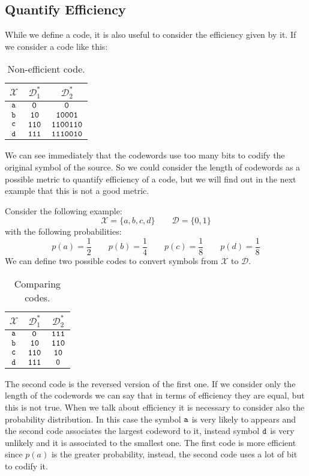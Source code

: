 \subsection{Quantify Efficiency}
While we define a code, it is also useful to consider the efficiency given by it. If we consider a code like this:
\begin{table}[H]
	\center
\begin{tabular}{| c | c | c |}
	\hline
	$\mathcal{X}$ & $\mathcal{D}^*_1$ & $\mathcal{D}^*_2$\\\hline
	$\verb|a|$ & $\verb|0|$ & $\verb|0|$ \\
	$\verb|b|$ & $\verb|10|$ & $\verb|10001|$ \\
	$\verb|c|$ & $\verb|110|$ & $\verb|1100110|$ \\
	$\verb|d|$ & $\verb|111|$ & $\verb|1110010|$ \\
	\hline
\end{tabular}
\caption{Non-efficient code.}
\end{table}
We can see immediately that the codewords use too many bits to codify the original symbol of the source. So we could consider the length of codewords as a possible metric to quantify efficiency of a code, but we will find out in the next example that this is not a good metric.
\begin{exmp} Consider the following example:
	$$\mathcal{X} = \{a, b, c, d\} \qquad \mathcal{D} = \{0,1\}$$
	with the following probabilities:
	$$p(a) = \frac{1}{2} \qquad p(b) = \frac{1}{4} \qquad p(c) = \frac{1}{8} \qquad p(d) = \frac{1}{8}$$
	We can define two possible codes to convert symbols from $\mathcal{X}$ to $\mathcal{D}$.
	\begin{table}[H]
		\centering
		\begin{tabular}{| c | c | c |}
			\hline
			$\mathcal{X}$ & $\mathcal{D}^*_1$ & $\mathcal{D}^*_2$\\\hline
			$\verb|a|$ & $\verb|0|$ & $\verb|111|$ \\
			$\verb|b|$ & $\verb|10|$ & $\verb|110|$ \\
			$\verb|c|$ & $\verb|110|$ & $\verb|10|$ \\
			$\verb|d|$ & $\verb|111|$ & $\verb|0|$ \\
			\hline
		\end{tabular}
		\caption{Comparing codes.}
	\end{table}
\end{exmp}
The second code is the reversed version of the first one. If we consider only the length of the codewords we can say that in terms of efficiency they are equal, but this is not true. When we talk about efficiency it is necessary to consider also the probability distribution. In this case the symbol $\verb|a|$ is very likely to appears and the second code associates the largest codeword to it, instead symbol $\verb|d|$ is very unlikely and it is associated to the smallest one. The first code is more efficient since $p(a)$ is the greater probability, instead, the second code uses a lot of bit to codify it.\\

